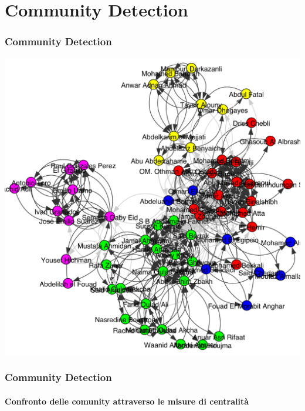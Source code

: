 \documentclass{beamer}
\begin{document}
\section{Community Detection}

\begin{frame}
\frametitle{Community Detection}
 \centering
\includegraphics[scale=0.35]{images/community-partition.pdf}
\end{frame}


\begin{frame}
\frametitle{Community Detection}
\framesubtitle{Confronto delle comunity attraverso le misure di centralità}

\end{frame}

\end{document}
